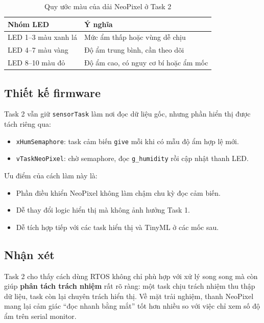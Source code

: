 \documentclass[12pt,a4paper]{article}
\begin{document}
\begin{table}[H]
\centering
\caption{Quy ước màu của dải NeoPixel ở Task 2}
\begin{tabular}{>{\raggedright\arraybackslash}p{} >{\raggedright\arraybackslash}p{}}
\toprule
\textbf{Nhóm LED} & \textbf{Ý nghĩa} \\
\midrule
LED 1--3 màu xanh lá & Mức ẩm thấp hoặc vùng dễ chịu \\
LED 4--7 màu vàng & Độ ẩm trung bình, cần theo dõi \\
LED 8--10 màu đỏ & Độ ẩm cao, có nguy cơ bí hoặc ẩm mốc \\
\bottomrule
\end{tabular}
\end{table}

\subsection{Thiết kế firmware}

Task 2 vẫn giữ \texttt{sensorTask} làm nơi đọc dữ liệu gốc, nhưng phần hiển thị được tách riêng qua:
\begin{itemize}
  \item \texttt{xHumSemaphore}: task cảm biến \texttt{give} mỗi khi có mẫu độ ẩm hợp lệ mới.
  \item \texttt{vTaskNeoPixel}: chờ semaphore, đọc \texttt{g\_humidity} rồi cập nhật thanh LED.
\end{itemize}

Ưu điểm của cách làm này là:
\begin{itemize}
  \item Phần điều khiển NeoPixel không làm chậm chu kỳ đọc cảm biến.
  \item Dễ thay đổi logic hiển thị mà không ảnh hưởng Task 1.
  \item Dễ tích hợp tiếp với các task hiển thị và TinyML ở các mốc sau.
\end{itemize}

\subsection{Nhận xét}

Task 2 cho thấy cách dùng RTOS không chỉ phù hợp với xử lý song song mà còn giúp \textbf{phân tách trách nhiệm} rất rõ ràng: một task chịu trách nhiệm thu thập dữ liệu, task còn lại chuyên trách hiển thị. Về mặt trải nghiệm, thanh NeoPixel mang lại cảm giác ``đọc nhanh bằng mắt'' tốt hơn nhiều so với việc chỉ xem số độ ẩm trên serial monitor.
\end{document}
